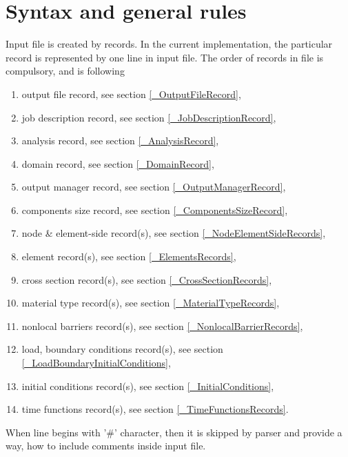 \documentclass[a4paper]{article}
\begin{document}
\section{Syntax and general rules}

Input file is created by records. In the current implementation, the
particular record is represented by one line in input file.
The order of records in file is
compulsory, and is following
\begin{enumerate}
\item output file record, see section \ref{_OutputFileRecord},
\item job description record, see section \ref{_JobDescriptionRecord},
\item analysis record, see section \ref{_AnalysisRecord},
\item domain record, see section \ref{_DomainRecord},
\item output manager record, see section \ref{_OutputManagerRecord},
\item components size record, see section \ref{_ComponentsSizeRecord},
\item node \& element-side  record(s), see section \ref{_NodeElementSideRecords},
\item element record(s), see section \ref{_ElementsRecords},
\item cross section record(s), see section \ref{_CrossSectionRecords},
\item material type  record(s), see section \ref{_MaterialTypeRecords},
\item nonlocal barriers record(s), see section \ref{_NonlocalBarrierRecords},
\item load, boundary  conditions record(s), see section
  \ref{_LoadBoundaryInitialConditions},
\item initial conditions record(s), see section \ref{_InitialConditions},
\item time functions record(s), see section \ref{_TimeFunctionsRecords}.
\end{enumerate} 
When line begins with '\#' character, then it is skipped by parser and
provide a way, how to include comments inside input file.
\end{document}
